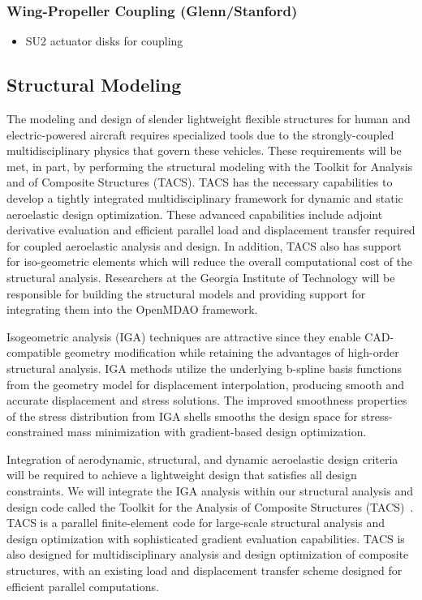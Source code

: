 \documentclass[]{aiaa-tc}
\begin{document}
    \subsubsection{Wing-Propeller Coupling (Glenn/Stanford)}
        \begin{itemize}
            \item SU2 actuator disks for coupling
        \end{itemize}

        \subsection{Structural Modeling}

The modeling and design of slender lightweight flexible structures for
human and electric-powered aircraft requires specialized tools due to
the strongly-coupled multidisciplinary physics that govern these
vehicles. These requirements will be met, in part, by performing the
structural modeling with the Toolkit for Analysis and of Composite
Structures (TACS). TACS has the necessary capabilities to develop a
tightly integrated multidisciplinary framework for dynamic and static
aeroelastic design optimization. These advanced capabilities include
adjoint derivative evaluation and efficient parallel load and
displacement transfer required for coupled aeroelastic analysis and
design.  In addition, TACS also has support for iso-geometric elements
which will reduce the overall computational cost of the structural
analysis. Researchers at the Georgia Institute of Technology will be
responsible for building the structural models and providing support
for integrating them into the OpenMDAO framework.

Isogeometric analysis (IGA) techniques are attractive since they
enable CAD-compatible geometry modification while retaining the
advantages of high-order structural analysis. IGA methods utilize the
underlying b-spline basis functions from the geometry model for
displacement interpolation, producing smooth and accurate displacement
and stress solutions. The improved smoothness properties of the stress
distribution from IGA shells smooths the design space for
stress-constrained mass minimization with gradient-based design
optimization.

Integration of aerodynamic, structural, and dynamic aeroelastic design
criteria will be required to achieve a lightweight design that
satisfies all design constraints. We will integrate the IGA analysis
within our structural analysis and design code called the Toolkit for
the Analysis of Composite Structures
(TACS)~\cite{Kennedy:2014:TACS}. TACS is a parallel finite-element
code for large-scale structural analysis and design optimization with
sophisticated gradient evaluation capabilities. TACS is also designed
for multidisciplinary analysis and design optimization of composite
structures, with an existing load and displacement transfer scheme
designed for efficient parallel computations.
\end{document}
